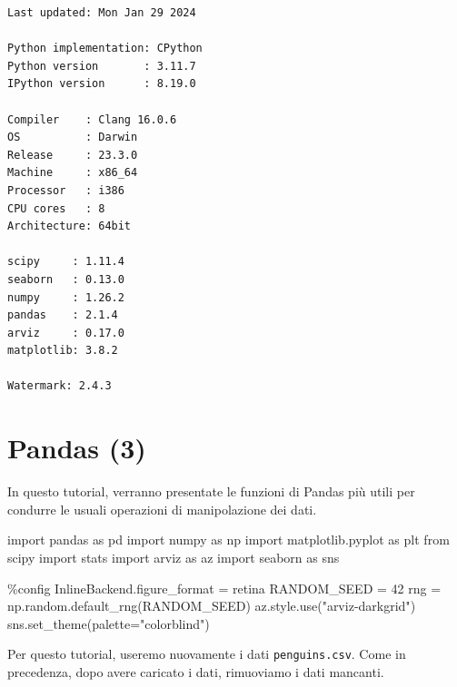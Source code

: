 \documentclass[
  letterpaper,
  krantz2]{{[}./krantz{]}}
\newenvironment{Shaded}{\begin{snugshade}}{\end{snugshade}}
\newcommand{\DecValTok}[1]{\textcolor[rgb]{0.68,0.00,0.00}{#1}}
\newcommand{\ImportTok}[1]{\textcolor[rgb]{0.00,0.46,0.62}{#1}}
\newcommand{\NormalTok}[1]{\textcolor[rgb]{0.00,0.23,0.31}{#1}}
\newcommand{\OperatorTok}[1]{\textcolor[rgb]{0.37,0.37,0.37}{#1}}
\newcommand{\StringTok}[1]{\textcolor[rgb]{0.13,0.47,0.30}{#1}}
\begin{document}
\begin{verbatim}
Last updated: Mon Jan 29 2024

Python implementation: CPython
Python version       : 3.11.7
IPython version      : 8.19.0

Compiler    : Clang 16.0.6 
OS          : Darwin
Release     : 23.3.0
Machine     : x86_64
Processor   : i386
CPU cores   : 8
Architecture: 64bit

scipy     : 1.11.4
seaborn   : 0.13.0
numpy     : 1.26.2
pandas    : 2.1.4
arviz     : 0.17.0
matplotlib: 3.8.2

Watermark: 2.4.3
\end{verbatim}

\chapter{Pandas (3)}\label{sec-pandas-3}

In questo tutorial, verranno presentate le funzioni di Pandas più utili
per condurre le usuali operazioni di manipolazione dei dati.

\begin{Shaded}
\begin{Highlighting}[]
\ImportTok{import}\NormalTok{ pandas }\ImportTok{as}\NormalTok{ pd}
\ImportTok{import}\NormalTok{ numpy }\ImportTok{as}\NormalTok{ np}
\ImportTok{import}\NormalTok{ matplotlib.pyplot }\ImportTok{as}\NormalTok{ plt}
\ImportTok{from}\NormalTok{ scipy }\ImportTok{import}\NormalTok{ stats}
\ImportTok{import}\NormalTok{ arviz }\ImportTok{as}\NormalTok{ az}
\ImportTok{import}\NormalTok{ seaborn }\ImportTok{as}\NormalTok{ sns}
\end{Highlighting}
\end{Shaded}

\begin{Shaded}
\begin{Highlighting}[]
\OperatorTok{\%}\NormalTok{config InlineBackend.figure\_format }\OperatorTok{=} \StringTok{\textquotesingle{}retina\textquotesingle{}}
\NormalTok{RANDOM\_SEED }\OperatorTok{=} \DecValTok{42}
\NormalTok{rng }\OperatorTok{=}\NormalTok{ np.random.default\_rng(RANDOM\_SEED)}
\NormalTok{az.style.use(}\StringTok{"arviz{-}darkgrid"}\NormalTok{)}
\NormalTok{sns.set\_theme(palette}\OperatorTok{=}\StringTok{"colorblind"}\NormalTok{)}
\end{Highlighting}
\end{Shaded}

Per questo tutorial, useremo nuovamente i dati \texttt{penguins.csv}.
Come in precedenza, dopo avere caricato i dati, rimuoviamo i dati
mancanti.
\end{document}
